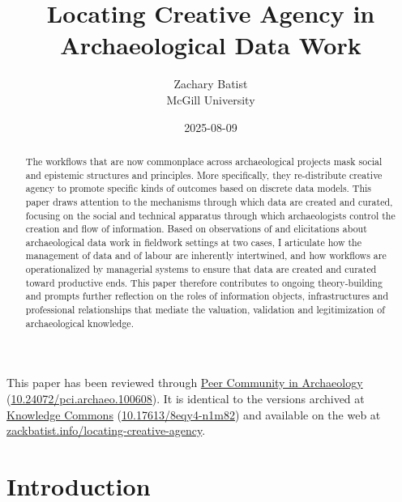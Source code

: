 \documentclass[
]{article}
\title{Locating Creative Agency in Archaeological Data Work}
\author{
      {Zachary
Batist \orcidlink{0000-0003-0435-508X} \href{mailto:zachary.batist@mcgill.ca}{\Letter}} \\
          McGill University
     \\
  }
\date{2025-08-09}
\begin{document}
\maketitle
\begin{abstract}
The workflows that are now commonplace across archaeological projects
mask social and epistemic structures and principles. More specifically,
they re-distribute creative agency to promote specific kinds of outcomes
based on discrete data models. This paper draws attention to the
mechanisms through which data are created and curated, focusing on the
social and technical apparatus through which archaeologists control the
creation and flow of information. Based on observations of and
elicitations about archaeological data work in fieldwork settings at two
cases, I articulate how the management of data and of labour are
inherently intertwined, and how workflows are operationalized by
managerial systems to ensure that data are created and curated toward
productive ends. This paper therefore contributes to ongoing
theory-building and prompts further reflection on the roles of
information objects, infrastructures and professional relationships that
mediate the valuation, validation and legitimization of archaeological
knowledge.
\end{abstract}


\begin{tcolorbox}[enhanced jigsaw, toprule=.15mm, opacitybacktitle=0.6, breakable, colbacktitle=quarto-callout-note-color!10!white, colback=white, left=2mm, leftrule=.75mm, title=\textcolor{quarto-callout-note-color}{\faInfo}\hspace{0.5em}{Note}, bottomtitle=1mm, colframe=quarto-callout-note-color-frame, rightrule=.15mm, toptitle=1mm, titlerule=0mm, opacityback=0, arc=.35mm, coltitle=black, bottomrule=.15mm]

This paper has been reviewed through
\href{https://archaeo.peercommunityin.org/}{Peer Community in
Archaeology}
(\href{https://doi.org/10.24072/pci.archaeo.100608}{10.24072/pci.archaeo.100608}).
{It is identical to the versions archived at
\href{https://hcommons.org/}{Knowledge Commons}
(\href{https://doi.org/10.17613/8eqy4-n1m82}{10.17613/8eqy4-n1m82}) and
available on the web at
\href{https://zackbatist.info/locating-creative-agency/}{zackbatist.info/locating-creative-agency}.}

\end{tcolorbox}

\section{Introduction}\label{introduction}
\end{document}

